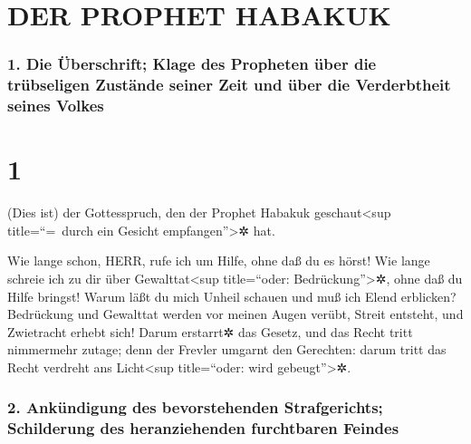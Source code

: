 \hypertarget{der-prophet-habakuk}{%
\section{DER PROPHET HABAKUK}\label{der-prophet-habakuk}}

\hypertarget{die-uxfcberschrift-klage-des-propheten-uxfcber-die-truxfcbseligen-zustuxe4nde-seiner-zeit-und-uxfcber-die-verderbtheit-seines-volkes}{%
\subsubsection{1. Die Überschrift; Klage des Propheten über die
trübseligen Zustände seiner Zeit und über die Verderbtheit seines
Volkes}\label{die-uxfcberschrift-klage-des-propheten-uxfcber-die-truxfcbseligen-zustuxe4nde-seiner-zeit-und-uxfcber-die-verderbtheit-seines-volkes}}

\hypertarget{section}{%
\section{1}\label{section}}

 (Dies ist) der Gottesspruch, den der Prophet Habakuk
geschaut\textless sup title=``=~durch ein Gesicht
empfangen''\textgreater✲ hat.

 Wie lange schon, HERR, rufe ich um Hilfe, ohne daß du es
hörst! Wie lange schreie ich zu dir über Gewalttat\textless sup
title=``oder: Bedrückung''\textgreater✲, ohne daß du Hilfe bringst!
 Warum läßt du mich Unheil schauen und muß ich Elend
erblicken? Bedrückung und Gewalttat werden vor meinen Augen verübt,
Streit entsteht, und Zwietracht erhebt sich!  Darum
erstarrt✲ das Gesetz, und das Recht tritt nimmermehr zutage; denn der
Frevler umgarnt den Gerechten: darum tritt das Recht verdreht ans
Licht\textless sup title=``oder: wird gebeugt''\textgreater✲.

\hypertarget{ankuxfcndigung-des-bevorstehenden-strafgerichts-schilderung-des-heranziehenden-furchtbaren-feindes}{%
\subsubsection{2. Ankündigung des bevorstehenden Strafgerichts;
Schilderung des heranziehenden furchtbaren
Feindes}\label{ankuxfcndigung-des-bevorstehenden-strafgerichts-schilderung-des-heranziehenden-furchtbaren-feindes}}

